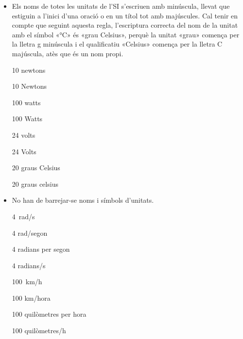\begin{itemize}
\textcolor{Red}\faTimesCircle{} \qty{20}{seg}

\textcolor{Green}\faCheckSquare{} \qty{80}{km/h}

\textcolor{Red}\faTimesCircle{} \qty{80}{kph}

\textcolor{Green}\faCheckSquare{} \qty{1500}{r/min}

\textcolor{Red}\faTimesCircle{} \qty{1500}{rpm}


\item Els noms de totes les unitats de l'SI s'escriuen amb minúscula, llevat que estiguin a l'inici d'una oració o en un títol tot amb majúscules. Cal tenir en compte que seguint aquesta regla, l'escriptura  correcta
del nom de la unitat amb el símbol «\unit{\degreeCelsius}» és «grau Celsius», perquè la unitat  «grau» comença per la lletra g  minúscula i el qualificatiu «Celsius» comença per la lletra C  majúscula, atès que és un nom propi.

\textcolor{Green}\faCheckSquare{} 10 newtons

\textcolor{Red}\faTimesCircle{} 10 Newtons

\textcolor{Green}\faCheckSquare{}  100 watts

\textcolor{Red}\faTimesCircle{} 100 Watts

\textcolor{Green}\faCheckSquare{}  24 volts

\textcolor{Red}\faTimesCircle{} 24 Volts

\textcolor{Green}\faCheckSquare{}  20 graus Celsius

\textcolor{Red}\faTimesCircle{} 20 graus celsius





\item No han de barrejar-se noms i símbols d'unitats.

\textcolor{Green}\faCheckSquare{} \qty{4}{rad/s}

\textcolor{Red}\faTimesCircle{} 4 rad/segon

\textcolor{Green}\faCheckSquare{} 4 radians per segon

\textcolor{Red}\faTimesCircle{} 4 radians/s

\textcolor{Green}\faCheckSquare{} \qty{100}{km/h}

\textcolor{Red}\faTimesCircle{} 100 km/hora

\textcolor{Green}\faCheckSquare{} 100 quilòmetres per hora

\textcolor{Red}\faTimesCircle{} 100 quilòmetres/h



\end{itemize}
